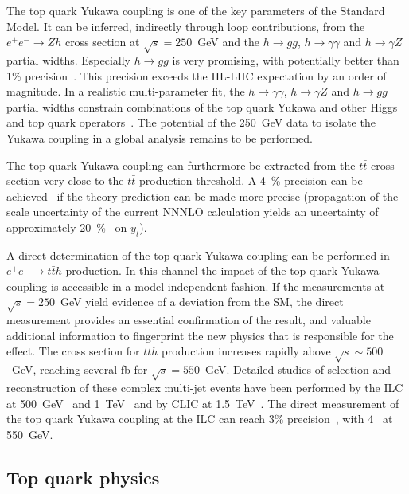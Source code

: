 The top quark Yukawa coupling is one of the key parameters of the Standard Model. 
It can be inferred, indirectly through loop contributions, from the $e^+e^- \rightarrow Zh$
cross section at $\sqrt{s}=  250$~GeV  and the $h \rightarrow gg$, $h \rightarrow \gamma \gamma$
and $h \rightarrow \gamma Z$ partial widths. Especially $h \rightarrow gg$ is very promising, with potentially
better than 1\% precision~\cite{Boselli:2018zxr}. This precision exceeds the HL-LHC expectation by an order of magnitude.
In a realistic multi-parameter fit, the $h \rightarrow \gamma \gamma$, $h \rightarrow \gamma Z$ and $h \rightarrow gg$
partial widths constrain combinations of the top quark Yukawa and other Higgs~\cite{Azatov:2016xik} and top quark
operators~\cite{Vryonidou:2018eyv}. The potential of the 250~GeV data to isolate the Yukawa
coupling in a global analysis remains to be performed.

The top-quark Yukawa coupling can furthermore be extracted from the $t\bar{t}$
cross section very close to the $t\bar{t}$ production threshold. A 4~\% precision can be achieved~\cite{Horiguchi:2013wra}
if the theory prediction can be made more precise (propagation of the scale uncertainty of the current NNNLO calculation yields
an uncertainty of approximately 20~\%~\cite{Vos:2016til} on $y_t$).

A direct determination of the top-quark Yukawa coupling can be performed in $e^+e^- \rightarrow t\bar{t}h$ production.
In this channel the impact of the top-quark Yukawa coupling is accessible in a model-independent fashion. If the
measurements at $\sqrt{s}=250$~GeV yield evidence of a deviation from the SM, the direct measurement provides
an essential confirmation of the result, and valuable additional information to fingerprint the new physics that
is responsible for the effect. The cross section for $t\bar{t}h$ production increases rapidly above $\sqrt{s} \sim 500 $~GeV,
reaching several fb for $\sqrt{s} = 550$~GeV. Detailed studies of selection and reconstruction of these complex multi-jet events
have been performed by the ILC at 500~GeV~\cite{Yonamine:2011jg} and 1~TeV~\cite{Price:2014oca} and by CLIC
at 1.5~TeV~\cite{Abramowicz:2018rjq}. The direct measurement of the top quark Yukawa coupling at the ILC can reach 3\%
precision~\cite{Fujii:2015jha}, with 4~\iab{} at 550~GeV.




\subsection{Top quark physics}
\label{subsec:highE:top}

